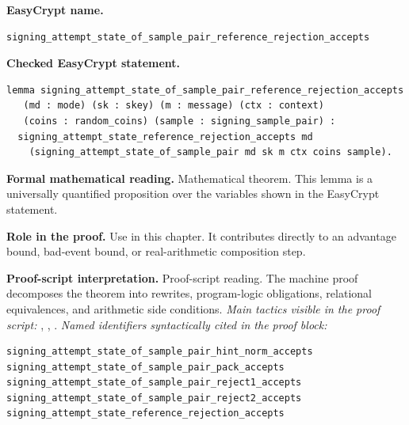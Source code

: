 \begin{formaltheorem}
\noindent\textbf{EasyCrypt name.}
\begin{lstlisting}[language=EasyCrypt,basicstyle=\ttfamily\scriptsize]
signing_attempt_state_of_sample_pair_reference_rejection_accepts
\end{lstlisting}
\noindent\textbf{Checked EasyCrypt statement.}
\begin{lstlisting}[language=EasyCrypt,basicstyle=\ttfamily\scriptsize]
lemma signing_attempt_state_of_sample_pair_reference_rejection_accepts
   (md : mode) (sk : skey) (m : message) (ctx : context)
   (coins : random_coins) (sample : signing_sample_pair) :
  signing_attempt_state_reference_rejection_accepts md
    (signing_attempt_state_of_sample_pair md sk m ctx coins sample).
\end{lstlisting}
\noindent\textbf{Formal mathematical reading.}
Mathematical theorem. This lemma is a universally quantified proposition over the variables shown in the EasyCrypt statement.

\noindent\textbf{Role in the proof.}
Use in this chapter. It contributes directly to an advantage bound, bad-event bound, or real-arithmetic composition step.

\noindent\textbf{Proof-script interpretation.}
Proof-script reading. The machine proof decomposes the theorem into rewrites, program-logic obligations, relational equivalences, and arithmetic side conditions.
\emph{Main tactics visible in the proof script:} , , .
\emph{Named identifiers syntactically cited in the proof block:}
\begin{lstlisting}[language=EasyCrypt,basicstyle=\ttfamily\scriptsize]
signing_attempt_state_of_sample_pair_hint_norm_accepts
signing_attempt_state_of_sample_pair_pack_accepts
signing_attempt_state_of_sample_pair_reject1_accepts
signing_attempt_state_of_sample_pair_reject2_accepts
signing_attempt_state_reference_rejection_accepts
\end{lstlisting}

\end{formaltheorem}


